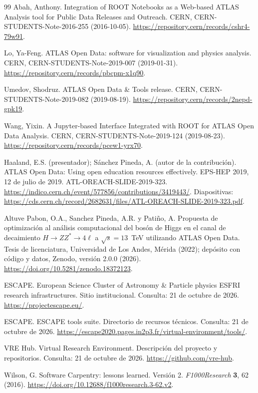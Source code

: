 \begin{thebibliography}{99}
 Abah, Anthony. Integration of ROOT Notebooks as a Web-based ATLAS Analysis tool for Public Data Releases and Outreach. CERN, CERN-STUDENTS-Note-2016-255 (2016-10-05). \url{https://repository.cern/records/cshr4-79w91}.

 Lo, Ya-Feng. ATLAS Open Data: software for visualization and physics analysis. CERN, CERN-STUDENTS-Note-2019-007 (2019-01-31). \url{https://repository.cern/records/pbcpm-x1q90}.

 Umedov, Shodruz. ATLAS Open Data \& Tools release. CERN, CERN-STUDENTS-Note-2019-082 (2019-08-19). \url{https://repository.cern/records/2nepd-gpk19}.

 Wang, Yixin. A Jupyter-based Interface Integrated with ROOT for ATLAS Open Data Analysis. CERN, CERN-STUDENTS-Note-2019-124 (2019-08-23). \url{https://repository.cern/records/pcew1-yrx70}.

 Haaland, E.S. (presentador); Sánchez Pineda, A. (autor de la contribución). ATLAS Open Data: Using open education resources effectively. EPS-HEP 2019, 12 de julio de 2019. ATL-OREACH-SLIDE-2019-323. \url{https://indico.cern.ch/event/577856/contributions/3419443/}. Diapositivas: \url{https://cds.cern.ch/record/2682631/files/ATL-OREACH-SLIDE-2019-323.pdf}.

 Altuve Pabon, O.A., Sanchez Pineda, A.R. y Patiño, A. Propuesta de optimización al análisis computacional del bosón de Higgs en el canal de decaimiento $H\to ZZ^{*}\to 4\ell$ a $\sqrt{s}=13$~TeV utilizando ATLAS Open Data. Tesis de licenciatura, Universidad de Los Andes, Mérida (2022); depósito con código y datos, Zenodo, versión 2.0.0 (2026). \url{https://doi.org/10.5281/zenodo.18372123}.

 ESCAPE. European Science Cluster of Astronomy \& Particle physics ESFRI research infrastructures. Sitio institucional. Consulta: 21 de octubre de 2026. \url{https://projectescape.eu/}.

 ESCAPE. ESCAPE tools suite. Directorio de recursos técnicos. Consulta: 21 de octubre de 2026. \url{https://escape2020.pages.in2p3.fr/virtual-environment/tools/}.

 VRE Hub. Virtual Research Environment. Descripción del proyecto y repositorios. Consulta: 21 de octubre de 2026. \url{https://github.com/vre-hub}.

 Wilson, G. Software Carpentry: lessons learned. Versión 2. \emph{F1000Research} \textbf{3}, 62 (2016). \url{https://doi.org/10.12688/f1000research.3-62.v2}.


\end{thebibliography}
